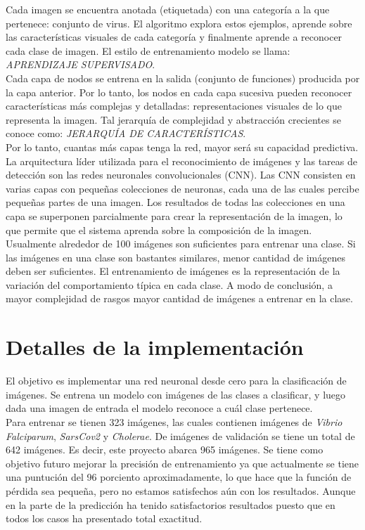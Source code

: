 \documentclass{book}
\begin{document}
			Cada imagen se encuentra anotada (etiquetada) con una categor\'ia a la que pertenece: conjunto de virus. El algoritmo explora estos ejemplos, aprende sobre las caracter\'isticas visuales de cada categor\'ia y finalmente aprende a reconocer cada clase de imagen. El estilo de entrenamiento modelo se llama: \textit{APRENDIZAJE SUPERVISADO}. \\
			Cada capa de nodos se entrena en la salida (conjunto de funciones) producida por la capa anterior. Por lo tanto, los nodos en cada capa sucesiva pueden reconocer caracter\'isticas m\'as complejas y detalladas: representaciones visuales de lo que representa la imagen. Tal jerarqu\'ia de complejidad y abstracci\'on crecientes se conoce como: \textit{JERARQU\'IA DE CARACTER\'ISTICAS}. \\
			Por lo tanto, cuantas m\'as capas tenga la red, mayor ser\'a su capacidad predictiva.\\
			La arquitectura l\'ider utilizada para el reconocimiento de im\'agenes y las tareas de detecci\'on son las redes neuronales convolucionales (CNN). Las CNN consisten en varias capas con pequeñas colecciones de neuronas, cada una de las cuales percibe peque\~nas partes de una imagen. Los resultados de todas las colecciones en una capa se superponen parcialmente para crear la representaci\'on de la imagen, lo que permite que el sistema aprenda sobre la composici\'on de la imagen. \\
			Usualmente alrededor de 100 im\'agenes son suficientes para entrenar una clase. Si las im\'agenes en una clase son bastantes similares, menor cantidad de im\'agenes deben ser suficientes. El entrenamiento de im\'agenes es la representaci\'on de la variaci\'on del comportamiento t\'ipica en cada clase. A modo de conclusi\'on, a mayor complejidad de rasgos mayor cantidad de im\'agenes a entrenar en la clase.
			
	\chapter{Detalles de la implementaci\'on}
		El objetivo es implementar una red neuronal desde cero para la clasificaci\'on de im\'agenes. Se entrena un modelo con im\'agenes de las clases a clasificar, y luego dada una imagen de entrada el modelo reconoce a cu\'al clase pertenece. \\
		Para entrenar se tienen 323 im\'agenes, las cuales contienen im\'agenes de \textit{Vibrio Falciparum}, \textit{SarsCov2} y \textit{Cholerae}.
		De im\'agenes de validaci\'on se tiene un total de 642 im\'agenes. Es decir, este proyecto abarca 965 im\'agenes. Se tiene como objetivo futuro mejorar la precisi\'on de entrenamiento ya que actualmente se tiene una puntuci\'on del 96 porciento aproximadamente, lo que hace que la funci\'on de p\'erdida sea peque\~na, pero no estamos satisfechos a\'un con los resultados. Aunque en la parte de la predicci\'on ha tenido satisfactorios resultados puesto que en todos los casos ha presentado total exactitud.
\end{document}
